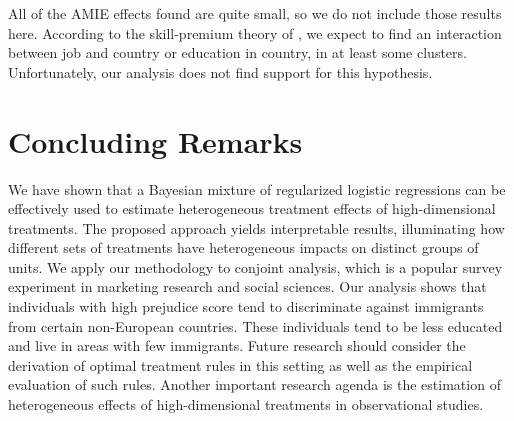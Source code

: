All of the AMIE effects found are quite small, so we do not include
those results here.  According to the skill-premium theory of
\cite{newman2019economic}, we expect to find an interaction between
job and country or education in country, in at least some clusters.
Unfortunately, our analysis does not find support for this hypothesis.


%

\section{Concluding Remarks}\label{sec:disc}

We have shown that a Bayesian mixture of regularized logistic
regressions can be effectively used to estimate heterogeneous
treatment effects of high-dimensional treatments.  The proposed
approach yields interpretable results, illuminating how different sets
of treatments have heterogeneous impacts on distinct groups of units.
We apply our methodology to conjoint analysis, which is a popular
survey experiment in marketing research and social sciences.  Our
analysis shows that individuals with high prejudice score tend to
discriminate against immigrants from certain non-European countries.
These individuals tend to be less educated and live in areas with few
immigrants.  Future research should consider the derivation of optimal
treatment rules in this setting as well as the empirical evaluation of
such rules.  Another important research agenda is the estimation of
heterogeneous effects of high-dimensional treatments in observational
studies.

